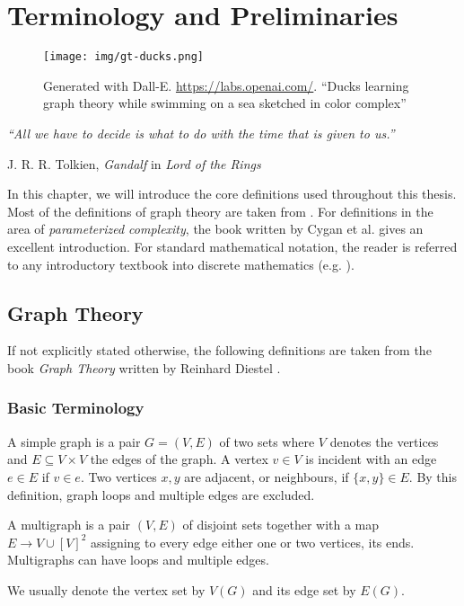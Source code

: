 \chapter{Terminology and Preliminaries}\label{ch:prelim}

\vspace*{-50pt}

\begin{figure}[ht]
        \texttt{[image: img/gt-ducks.png]}
        \captionsetup{textformat=empty,labelformat=blank}
        \caption{Generated with Dall-E. \url{https://labs.openai.com/}. ``Ducks learning graph theory while swimming on a sea sketched in color complex''}
\end{figure}

\epigraph{\itshape ``All we have to decide is what to do with the time that is given to us.''}{J. R. R. Tolkien, \textit{Gandalf} in \textit{Lord of the Rings}}


In this chapter, we will introduce the core definitions used throughout this thesis. 
Most of the definitions of graph theory are taken from \cite{Diekert2005}. 
For definitions in the area of \textit{parameterized complexity}, the book written by Cygan et al. \cite{Cygan2015} gives an excellent introduction.
For standard mathematical notation, the reader is referred to any introductory textbook into discrete mathematics (e.g. \cite{Rosen2012}).

\section{Graph Theory}

If not explicitly stated otherwise, the following definitions are taken from the book \textit{Graph Theory} written by Reinhard Diestel \cite{diestel10}.

\subsection{Basic Terminology}

\begin{definition}[Graph]
    A simple graph is a pair $G = (V, E)$ of two sets where $V$ denotes the vertices and $E \subseteq V \times V$ the edges of the graph.  A vertex $v \in V$ is incident with an edge $e \in E$ if $v \in e$. Two vertices $x, y$ are adjacent, or neighbours, if $\{x,y \} \in E$. By this definition, graph loops and multiple edges are excluded.
    
    A multigraph is a pair $(V, E)$ of disjoint sets together with a map $E \rightarrow V \cup [V]^2$ assigning to every edge either one or two vertices, its ends. Multigraphs can have loops and multiple edges.
    
    We usually denote the vertex set by $V(G)$ and its edge set by $E(G)$.



\end{definition}

